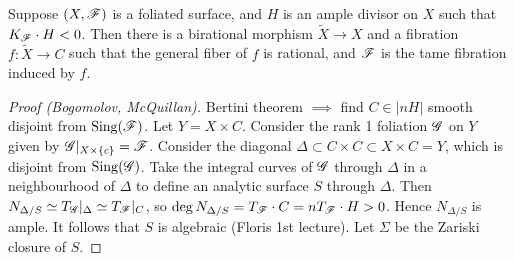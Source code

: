 \begin{theorem}[Miyaoka]
    Suppose $(X,\mathscr{F})$ is a foliated surface, and $H$ is an ample divisor on
    $X$ such that $K_{\mathscr{F}}\cdot H<0$. Then there is a birational morphism
    $\tilde X\to X$ and a fibration $f:\tilde X\to C$ such that the general
    fiber of $f$ is rational, and $\mathscr{F}$ is the tame fibration induced by $f$.
\end{theorem}

\begin{proof}[Proof (Bogomolov, McQuillan)]
    Bertini theorem $\implies$ find $C\in|nH|$ smooth disjoint from
    $\operatorname{Sing}(\mathscr{F})$. Let $Y=X\times C$. Consider the rank 1 foliation $\mathscr{G}$ on
    $Y$ given by $\mathscr{G}|_{X\times\{c\}}=\mathscr{F}$. Consider the diagonal
    $\Delta\subset C\times C\subset X\times C=Y$, which is disjoint from
    $\operatorname{Sing}(\mathscr{G})$. Take the integral curves of $\mathscr{G}$ through $\Delta$ in a
    neighbourhood of $\Delta$ to define an analytic surface $S$ through
    $\Delta$. Then $N_{\Delta/S}\simeq T_{\mathscr{G}}|_\Delta\simeq T_{\mathscr{F}}|_C$, so
    $\deg N_{\Delta/S}=T_{\mathscr{F}}\cdot C=nT_{\mathscr{F}}\cdot H>0$. Hence $N_{\Delta/S}$
    is ample. It follows that $S$ is algebraic (Floris 1st lecture). Let
    $\Sigma$ be the Zariski closure of $S$.
\end{proof}
